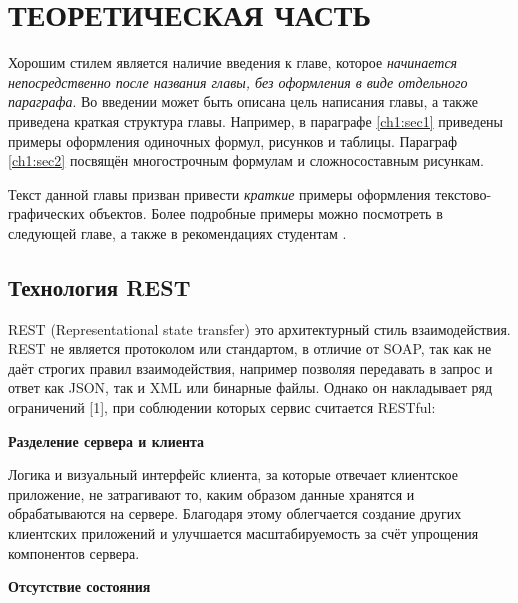 

\chapter{ТЕОРЕТИЧЕСКАЯ ЧАСТЬ} \label{ch:ch1}


Хорошим стилем является наличие введения к главе, которое \textit{начинается непосредственно после названия главы, без оформления в виде отдельного параграфа}.
Во введении может быть описана цель написания главы, а также приведена краткая структура главы.
Например, в параграфе \ref{ch1:sec1} приведены примеры оформления одиночных формул, рисунков и таблицы.
Параграф \ref{ch1:sec2} посвящён многострочным формулам и сложносоставным рисункам.

Текст данной главы призван привести \textit{краткие} примеры оформления текстово-графических объектов.
Более подробные примеры можно посмотреть в следующей главе, а также в рекомендациях студентам \cite{spbpu-student-thesis-template-author-guide}.


\section{Технология REST}\label{sec:rest}

REST (Representational state transfer) это архитектурный стиль взаимодействия.
REST не является протоколом или стандартом, в отличие от SOAP, так как не даёт строгих правил взаимодействия, например позволяя передавать в запрос и ответ как JSON, так и XML или бинарные файлы.
Однако он накладывает ряд ограничений [1], при соблюдении которых сервис считается RESTful:

\textbf{Разделение сервера и клиента}

Логика и визуальный интерфейс клиента, за которые отвечает клиентское приложение, не затрагивают то, каким образом данные хранятся и обрабатываются на сервере.
Благодаря этому облегчается создание других клиентских приложений и улучшается масштабируемость за счёт упрощения компонентов сервера.

\textbf{Отсутствие состояния}

